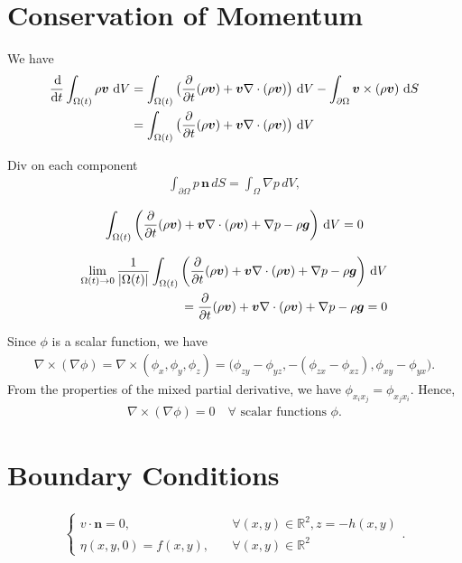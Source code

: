 \section{Conservation of Momentum}

We have
\begin{align}
	\begin{aligned}
	    \frac{\operatorname{d}\!}{\operatorname{d}\! t} \int_{\Omega(t)} \rho \bm{v} \, \operatorname{d}\! V 
	        & = \int_{\Omega(t)} \big(\frac{\partial}{\partial t}(\rho \bm{v})
	                + \bm{v} \nabla \cdot (\rho \bm{v}) \big) \, \operatorname{d}\! V
	                - \int_{\partial \Omega} \bm{v} \times (\rho \bm{v}) \, \operatorname{d}\! S \\
	        & = \int_{\Omega(t)} \big(\frac{\partial}{\partial t}(\rho \bm{v})
	                + \bm{v} \nabla \cdot (\rho \bm{v}) \big) \, \operatorname{d}\! V                
	\end{aligned}
\end{align}

Div on each component
\begin{align}
    \int_{\partial \Omega} p \, \bm{n} \, d S = \int_{\Omega} \nabla p \, d V,
\end{align}

\begin{align}
    \int_{\Omega(t)} \bigg(\frac{\partial}{\partial t}(\rho \bm{v})
	                + \bm{v} \nabla \cdot (\rho \bm{v}) + \nabla p - \rho \bm{g} \bigg) \, \operatorname{d}\! V = 0
\end{align}

\begin{align}
    \lim_{\Omega(t) \rightarrow 0} \frac{1}{|\Omega(t)|}\int_{\Omega(t)} \bigg(\frac{\partial}{\partial t}(\rho \bm{v})
	                + \bm{v} \nabla \cdot (\rho \bm{v}) + \nabla p - \rho \bm{g} \bigg) \, \operatorname{d}\! V \\
	                = \frac{\partial}{\partial t}(\rho \bm{v})
	                + \bm{v} \nabla \cdot (\rho \bm{v}) + \nabla p - \rho \bm{g} = 0
\end{align}

Since $\phi$ is a scalar function, we have
\begin{align}
    \nabla \times (\nabla \phi) = \nabla \times (\phi_x, \phi_y, \phi_z) =
        \big(\phi_{zy} - \phi_{yz}, -(\phi_{zx} - \phi_{xz}), \phi_{xy} - \phi_{yx} \big).
\end{align}
From the properties of the mixed partial derivative, we have $\phi_{x_i x_j} = \phi_{x_j x_i}$. Hence,
\begin{align}
    \nabla \times (\nabla \phi) = 0 \quad \forall \text{ scalar functions } \phi.
\end{align}

\section{Boundary Conditions}

\begin{align}
	\begin{cases}
	    v\cdot \bm{n} = 0,    &  \quad  \forall (x,y) \in \mathbb{R}^2, z = -h(x,y) \\
	    \eta(x,y,0) = f(x,y), &  \quad  \forall (x,y) \in \mathbb{R}^2
	\end{cases}.
\end{align}

